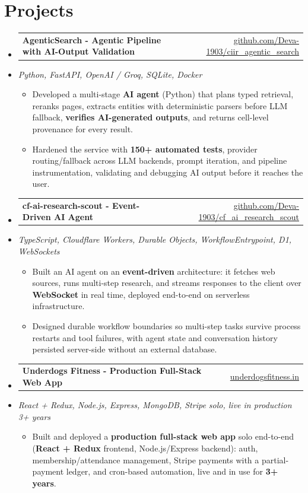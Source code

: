 \documentclass[letterpaper,10pt]{article}
\makeatletter
\newcommand{\resumeItem}[1]{
  \item\small{#1\vspace{-1pt}}
}
\newcommand{\resumeProjectHeading}[2]{
    \item
    \begin{tabular*}{0.985\textwidth}[t]{l@{\extracolsep{\fill}}r}
      \small\textbf{#1} & \small #2 \\
    \end{tabular*}\vspace{-5pt}
}
\newcommand{\resumeProjectSubheading}[1]{
  \vspace{-2pt}\item[] {\small\textcolor{ResumeSlate}{\emph{#1}}}\vspace{-3pt}
}
\newcommand{\resumeSubHeadingListStart}{\begin{itemize}[leftmargin=0.0in, label={}, itemsep=2pt, topsep=2pt]}
\newcommand{\resumeSubHeadingListEnd}{\end{itemize}}
\newcommand{\resumeItemListStart}{\begin{itemize}[leftmargin=0.18in, itemsep=2pt, topsep=1pt]}
\newcommand{\resumeItemListEnd}{\end{itemize}\vspace{-4pt}}
\makeatother
\begin{document}
\section{Projects}
\resumeSubHeadingListStart
  \resumeProjectHeading
    {AgenticSearch - Agentic Pipeline with AI-Output Validation}
    {\href{https://github.com/Deva-1903/ciir_agentic_search}{github.com/Deva-1903/ciir\_agentic\_search}}
  \resumeProjectSubheading{Python, FastAPI, OpenAI / Groq, SQLite, Docker}
    \resumeItemListStart
      \resumeItem{Developed a multi-stage \textbf{AI agent} (Python) that plans typed retrieval, reranks pages, extracts entities with deterministic parsers before LLM fallback, \textbf{verifies AI-generated outputs}, and returns cell-level provenance for every result.}
      \resumeItem{Hardened the service with \textbf{150+ automated tests}, provider routing/fallback across LLM backends, prompt iteration, and pipeline instrumentation, validating and debugging AI output before it reaches the user.}
    \resumeItemListEnd
  \resumeProjectHeading
    {cf-ai-research-scout - Event-Driven AI Agent}
    {\href{https://github.com/Deva-1903/cf_ai_research_scout}{github.com/Deva-1903/cf\_ai\_research\_scout}}
  \resumeProjectSubheading{TypeScript, Cloudflare Workers, Durable Objects, WorkflowEntrypoint, D1, WebSockets}
    \resumeItemListStart
      \resumeItem{Built an AI agent on an \textbf{event-driven} architecture: it fetches web sources, runs multi-step research, and streams responses to the client over \textbf{WebSocket} in real time, deployed end-to-end on serverless infrastructure.}
      \resumeItem{Designed durable workflow boundaries so multi-step tasks survive process restarts and tool failures, with agent state and conversation history persisted server-side without an external database.}
    \resumeItemListEnd
  \resumeProjectHeading
    {Underdogs Fitness - Production Full-Stack Web App}
    {\href{https://www.underdogsfitness.in/}{underdogsfitness.in}}
  \resumeProjectSubheading{React + Redux, Node.js, Express, MongoDB, Stripe \enspace\textbar\enspace solo, live in production 3+ years}
    \resumeItemListStart
      \resumeItem{Built and deployed a \textbf{production full-stack web app} solo end-to-end (\textbf{React + Redux} frontend, Node.js/Express backend): auth, membership/attendance management, Stripe payments with a partial-payment ledger, and cron-based automation, live and in use for \textbf{3+ years}.}
    \resumeItemListEnd
\resumeSubHeadingListEnd
\vspace{-4pt}
\end{document}
